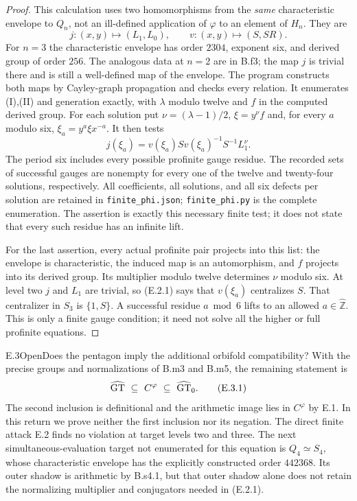 \begin{proof}
This calculation uses two homomorphisms from the \emph{same}
characteristic envelope to $Q_n$, not an ill-defined application of
$\varphi$ to an element of $H_n$. They are
\[
 j:(x,y)\mapsto(L_1,L_0),\qquad
 v:(x,y)\mapsto(S,SR).
\]
For $n=3$ the characteristic envelope has order $2304$, exponent six,
and derived group of order $256$. The analogous data at $n=2$ are in
B.f3; the map $j$ is trivial there and is still a well-defined map of
the envelope. The program constructs both maps by Cayley-graph
propagation and checks every relation. It enumerates (I),(II) and
generation exactly, with $\lambda$ modulo twelve and $f$ in the
computed derived group. For each solution put
$\nu=(\lambda-1)/2$, $\xi=y^\nu f$ and, for every $a$ modulo six,
$\xi_a=y^a\xi x^{-a}$. It then tests
\[
 j(\xi_a)=v(\xi_a)S v(\xi_a)^{-1}S^{-1}L_1^\nu.
 \tag{E.2.1}
\]
The period six includes every possible profinite gauge residue.
The recorded sets of successful gauges are nonempty for every one of
the twelve and twenty-four solutions, respectively. All coefficients,
all solutions, and all six defects per solution are retained in
\texttt{finite\_phi.json}; \texttt{finite\_phi.py} is the complete
enumeration. The assertion is exactly this necessary finite test; it
does not state that every such residue has an infinite lift.

For the last assertion, every actual profinite pair projects into this
list: the envelope is characteristic, the induced map is an automorphism,
and $f$ projects into its derived group. Its multiplier modulo twelve
determines $\nu$ modulo six. At level two $j$ and $L_1$ are trivial, so
(E.2.1) says that $v(\xi_a)$ centralizes $S$. That centralizer in $S_3$
is $\{1,S\}$. A successful residue $a\bmod6$ lifts to an allowed
$a\in\widehat{\mathbb Z}$. This is only a finite gauge condition;
it need not solve all the higher or full profinite equations.
\end{proof}

\begin{claim}{E.3}{Open}{Does the pentagon imply the additional orbifold compatibility?}
With the precise groups and normalizations of B.m3 and B.m5, the
remaining statement is
\[
 \widehat{\mathrm{GT}}\ \subseteq\ C^\varphi\ \subseteq\ \widehat{\mathrm{GT}}_0.
 \tag{E.3.1}
\]
The second inclusion is definitional and the arithmetic image lies in
$C^\varphi$ by E.1. In this return we prove neither the first inclusion
nor its negation. The direct finite attack E.2 finds no violation at
target levels two and three. The next simultaneous-evaluation target
not enumerated for this equation is $Q_4\simeq S_4$, whose characteristic
envelope has the explicitly constructed order $442368$. Its outer
shadow is arithmetic by B.s4.1, but that outer shadow alone does not
retain the normalizing multiplier and conjugators needed in (E.2.1).
\end{claim}

